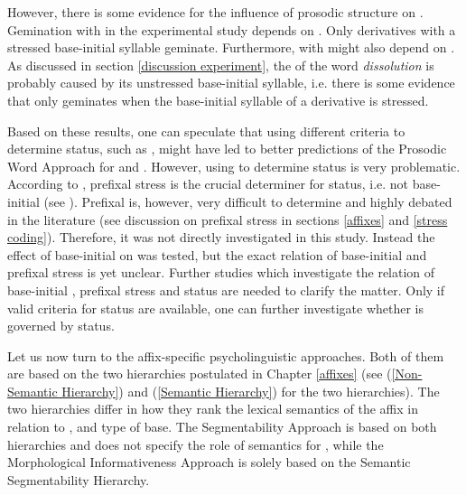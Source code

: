 However, there is some evidence 
for the influence of prosodic structure on . 
Gemination with  in the experimental study depends on . Only derivatives with a stressed base-initial syllable geminate. Furthermore,  with  might also depend on . As discussed in section  \ref{discussion experiment}, the  of the word \textit{dissolution} is probably caused by its unstressed base-initial syllable, i.e. there is some evidence that  only geminates when the base-initial syllable of a derivative is stressed. 

Based on these results, one can speculate that using different criteria to determine  status, such as , might have led to better predictions of the Prosodic Word Approach for  and . 
However, using  to determine  status is very problematic. %
 According to \cite{Raffelsiefen.1999}, prefixal stress is the crucial determiner for  status, i.e. not base-initial  (see ). Prefixal  is, however, very difficult to determine and highly debated in the literature (see discussion on prefixal stress in sections \ref{affixes} and \ref{stress coding}). Therefore, it was not directly investigated in this study. Instead the effect of base-initial  on  was tested, but the exact relation of base-initial  and prefixal stress is yet unclear.
Further studies which investigate the relation of base-initial , prefixal stress and  status are needed to clarify the matter. Only if valid criteria for  status are available, one can further investigate whether  is governed by  status. 

 




Let us now turn to the affix-specific psycholinguistic approaches. Both of them are based on the two  hierarchies postulated in Chapter \ref{affixes} (see  (\ref{Non-Semantic Hierarchy})  and (\ref{Semantic Hierarchy}) for the two hierarchies).
The two hierarchies differ in how they rank the lexical semantics of the affix in relation to ,  and type of base. The Segmentability Approach is based on both hierarchies and does not specify the role of semantics for , while the Morphological Informativeness Approach is solely based on the Semantic Segmentability Hierarchy.%

